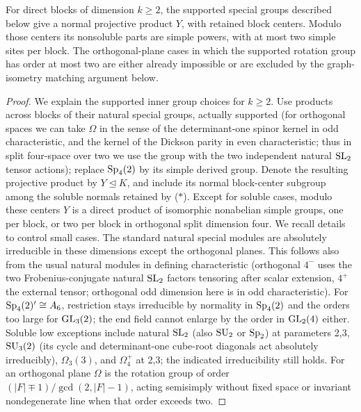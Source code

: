 \begin{lemma}\label{c:direct-block-groups}
For direct blocks of dimension \(k\ge2\), the supported special groups described below give a normal projective product \(Y\), with retained block centers. Modulo those centers its nonsoluble parts are simple powers, with at most two simple sites per block. The orthogonal-plane cases in which the supported rotation group has order at most two are either already impossible or are excluded by the graph-isometry matching argument below.
\end{lemma}

\begin{proof}
We explain the supported inner group choices for \(k\ge2\). Use products across blocks of their natural special groups, actually supported (for orthogonal spaces we can take \(\Omega\) in the sense of the determinant-one spinor kernel in odd characteristic, and the kernel of the Dickson parity in even characteristic; thus in split four-space over two we use the group with the two independent natural \({\rm SL}_2\) tensor actions); replace \({\rm Sp}_4(2)\) by its simple derived group. Denote the resulting projective product by \(Y\trianglelefteq K\), and include its normal block-center subgroup among the soluble normals retained by (\(*\)). Except for soluble cases, modulo these centers \(Y\) is a direct product of isomorphic nonabelian simple groups, one per block, or two per block in orthogonal split dimension four. We recall details to control small cases. The standard natural special modules are absolutely irreducible in these dimensions except the orthogonal planes. This follows also from the usual natural modules in defining characteristic (orthogonal \(4^-\) uses the two Frobenius-conjugate natural \({\rm SL}_2\) factors tensoring after scalar extension, \(4^+\) the external tensor; orthogonal odd dimension here is in odd characteristic). For \({\rm Sp}_4(2)'\cong A_6\), restriction stays irreducible by normality in \({\rm Sp}_4(2)\) and the orders too large for \({\rm GL}_3(2)\); the end field cannot enlarge by the order in \({\rm GL}_2(4)\) either. Soluble low exceptions include natural \({\rm SL}_2\) (also \({\rm SU}_2\) or \({\rm Sp}_2\)) at parameters 2,3, \({\rm SU}_3(2)\) (its cycle and determinant-one cube-root diagonals act absolutely irreducibly), \(\Omega_3(3)\), and \(\Omega_4^+\) at 2,3; the indicated irreducibility still holds. For an orthogonal plane \(\Omega\) is the rotation group of order \((|F|\mp1)/\gcd(2,|F|-1)\), acting semisimply without fixed space or invariant nondegenerate line when that order exceeds two.


\end{proof}
